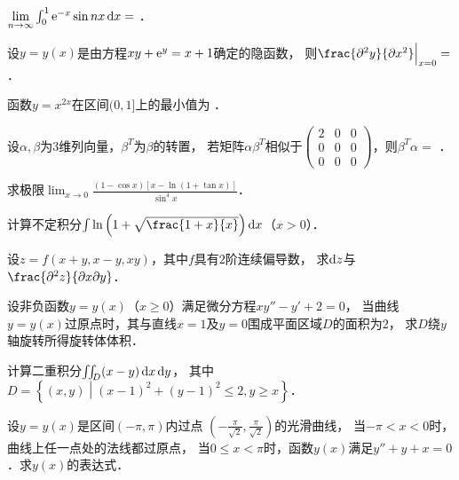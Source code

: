 \documentclass[plain,noanswer,medmath]{../../template/jnuexam}
\begin{document}
\begin{problem}
$\lim_{n \to \infty} \int_{0}^{1} \e^{- x}\sin nx\dx =$ \fillin{}．
\end{problem}


\begin{problem}
设$y = y(x)$是由方程$xy + \mathrm{e}^y = x + 1$确定的隐函数，
则$\frac{\pd^2 y}{\pd x^2}\Big|_{x = 0} =$ \fillin{}．
\end{problem}


\begin{problem}
函数$y = x^{2x}$在区间$(0,1]$上的最小值为 \fillin{}．
\end{problem}


\begin{problem}
设$\alpha ,\beta$为3维列向量，$\beta^{T}$为$\beta$的转置，
若矩阵$\alpha \beta^{T}$相似于$\begin{pmatrix}
  2 & 0 & 0 \\
  0 & 0 & 0 \\
  0 & 0 & 0
\end{pmatrix}$，则$\beta^{T}\alpha =$ \fillin{}．
\end{problem}




\begin{problem}[points=9]
求极限$\lim_{x \to 0} \frac{\left(1 - \cos x \right)\left[x - \ln(1 + \tan x) \right]}{\sin^4 x}$．
\end{problem}


\begin{problem}[points=10]
计算不定积分$\int \ln \left(1 + \sqrt{\frac{1 + x}{x}} \right)\dx$（$x > 0$）．
\end{problem}


\begin{problem}[points=10]
设$z=f(x+y,x-y,xy)$，其中$f$具有$2$阶连续偏导数，
求$\mathop{}\!\mathrm{d} z$与$\frac{\pd^2 z}{\pdx\pd y}$．
\end{problem}


\begin{problem}[points=10]
设非负函数$y = y(x)$（$x \ge 0$）满足微分方程$xy'' - y' + 2 = 0$，
当曲线$y = y(x)$过原点时，其与直线$x = 1$及$y = 0$围成平面区域$D$的面积为$2$，
求$D$绕$y$轴旋转所得旋转体体积．
\end{problem}


\begin{problem}[points=10]
计算二重积分$\iint_D (x - y)\mathop{}\!\mathrm{d} x\mathop{}\!\mathrm{d} y$，
其中$D = \left\{(x,y) \middle| (x - 1)^2 + (y - 1)^2 \le 2,y \ge x \right\}$．
\end{problem}


\begin{problem}[points=12]
设$y = y(x)$是区间$(- \pi ,\pi)$内过点
$\left(- \frac{\pi}{\sqrt{2}},\frac{\pi}{\sqrt{2}} \right)$的光滑曲线，
当$- \pi < x < 0$时，曲线上任一点处的法线都过原点，
当$0 \le x < \pi$时，函数$y(x)$满足$y'' + y + x = 0$．求$y(x)$的表达式．
\end{problem}






\end{document}
